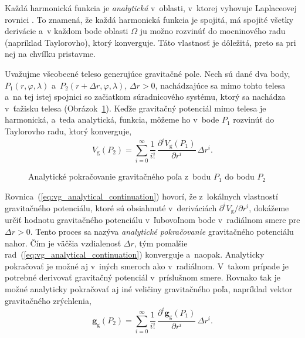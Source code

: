 \documentclass[a4paper,12pt]{book}
\newcommand{\gidx}{\mathrm g}
\let\vec\mathbf
\begin{document}
Každá harmonická funkcia je \emph{analytická} v~oblasti, v~ktorej vyhovuje
Laplaceovej rovnici \parencite{MoritzPhysicalGeodesy}.  To znamená, že každá
harmonická funkcia je spojitá, má spojité všetky derivácie a~v každom bode
oblasti $\Omega$ ju možno rozvinúť do mocninového radu (napríklad Taylorovho),
ktorý konverguje.  Táto vlastnosť je dôležitá, preto sa pri nej na chvíľku
pristavme.

Uvažujme všeobecné teleso generujúce gravitačné pole.  Nech sú dané dva body,
$P_1(r, \varphi, \lambda)$ a~$P_2(r + \Delta r, \varphi, \lambda)$, $\Delta
r > 0$, nachádzajúce sa mimo tohto telesa a~na tej istej spojnici so začiatkom
súradnicového systému, ktorý sa nachádza v~ťažisku telesa
(Obrázok~\ref{fig:analytical_continuation}).  Keďže gravitačný potenciál mimo
telesa je harmonická, a~teda analytická, funkcia, môžeme ho v~bode $P_1$
rozvinúť do Taylorovho radu, ktorý konverguje,
%
\begin{equation}
\label{eq:vg_analytical_continuation}
V_\gidx(P_2) = \sum_{i = 0}^\infty \frac{1}{i!} \, \frac{\partial^i
V_\gidx(P_1)}{\partial r^i} \, \Delta r^i{.}
\end{equation}

\begin{figure}
\centering

\caption{Analytické pokračovanie gravitačného poľa z~bodu $P_1$ do bodu $P_2$}
\label{fig:analytical_continuation}
\end{figure}

Rovnica~(\ref{eq:vg_analytical_continuation}) hovorí, že z~lokálnych vlastností
gravitačného potenciálu, ktoré sú obsiahnuté v~deriváciách $\partial^i V_\gidx
\slash \partial r^i$, dokážeme určiť hodnotu gravitačného potenciálu
v~ľubovoľnom bode v~radiálnom smere pre $\Delta r > 0$.  Tento proces sa nazýva
\emph{analytické pokračovanie} gravitačného potenciálu nahor.  Čím je väčšia
vzdialenosť $\Delta r$, tým pomalšie
rad~(\ref{eq:vg_analytical_continuation}) konverguje a~naopak.  Analyticky
pokračovať je možné aj v~iných smeroch ako v~radiálnom.  V~takom prípade je
potrebné derivovať gravitačný potenciál v~príslušnom smere.  Rovnako tak je
možné analyticky pokračovať aj iné veličiny gravitačného poľa, napríklad vektor
gravitačného zrýchlenia,
%
\begin{equation}
\label{eq:gg_analytical_continuation}
\vec g_\gidx(P_2) = \sum_{i = 0}^{\infty} \frac{1}{i!} \, \frac{\partial^i \vec
g_\gidx(P_1)}{\partial r^i} \, \Delta r^i{.}
\end{equation}
\end{document}
